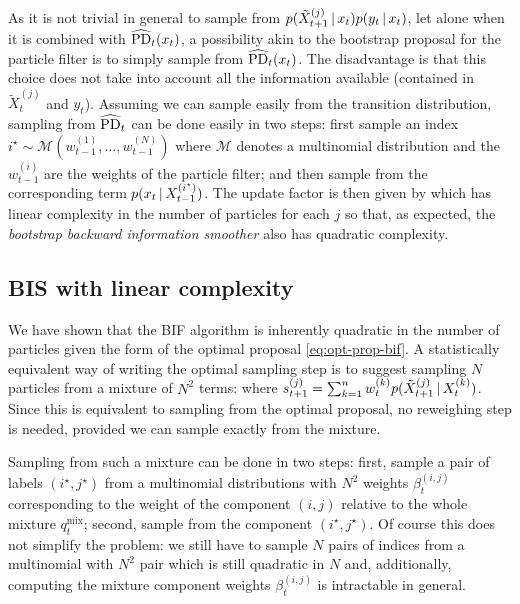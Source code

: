 As it is not trivial in general to sample from $p(\tilde X^{(j)}_{t+1}\,|\, x_{t})p(y_{t}\,|\, x_{t})$, let alone when it is combined with $\widehat{\text{PD}}_{t}(x_{t})$, a possibility akin to the bootstrap proposal for the particle filter is to simply sample from $\widehat{\text{PD}}_{t}(x_{t})$. The disadvantage is that this choice does not take into account all the information available (contained in $\tilde X^{(j)}_{t}$ and $y_{t}$). Assuming we can sample easily from the transition distribution, sampling from $\widehat{\text{PD}}_{t}$ can be done easily in two steps: first sample an index $i^{\star}\sim \mathcal M(w^{(1)}_{t-1}, \dots, w^{(N)}_{t-1})$ where $\mathcal M$ denotes a multinomial distribution and the $w_{t-1}^{(i)}$ are the weights of the particle filter; and then sample from the corresponding term $p(x_{t}\,|\, X^{(i^{\star})}_{t-1})$. The update factor is then given by
%
%
which has linear complexity in the number of particles for each $j$ so that, as expected, the \emph{bootstrap backward information smoother} also has quadratic complexity.

\subsection{BIS with linear complexity}
%
We have shown that the BIF algorithm is inherently quadratic in the number of particles given the form of the optimal proposal \eqref{eq:opt-prop-bif}. A statistically equivalent way of writing the optimal sampling step is to suggest sampling $N$ particles from a mixture of $N^{2}$ terms: 
%
where $s^{(j)}_{t+1}=\sum_{k=1}^{n}w^{(k)}_{t}p(\tilde X^{(j)}_{t+1}\,|\, X^{(k)}_{t})$. Since this is equivalent to sampling from the optimal proposal, no reweighing step is needed, provided we can sample exactly from the mixture.
 
Sampling from such a mixture can be done in two steps: first, sample a pair of labels $(i^{\star},j^{\star})$ from a multinomial distributions with $N^{2}$ weights $\beta^{(i,j)}_{t}$ corresponding to the weight of the component $(i,j)$ relative to the whole mixture $q_{t}^{\text{mix}}$; second, sample from the component $(i^{\star},j^{\star})$. 
Of course this does not simplify the problem: we still have to sample $N$ pairs of indices from a multinomial with $N^{2}$ pair which is still quadratic in $N$ and, additionally, computing the mixture component weights $\beta^{(i,j)}_{t}$ is intractable in general. 

